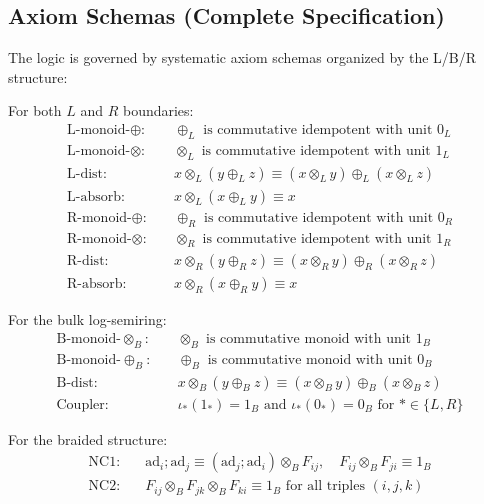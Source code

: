 \subsection{Axiom Schemas (Complete Specification)}

The logic is governed by systematic axiom schemas organized by the L/B/R structure:

\begin{definition}
\label{def:boundary-axioms}
For both $L$ and $R$ boundaries:
\begin{align}
\text{L-monoid-}\oplus: &\quad \oplus_L \text{ is commutative idempotent with unit } 0_L \\
\text{L-monoid-}\otimes: &\quad \otimes_L \text{ is commutative idempotent with unit } 1_L \\
\text{L-dist:} &\quad x \otimes_L (y \oplus_L z) \equiv (x \otimes_L y) \oplus_L (x \otimes_L z) \\
\text{L-absorb:} &\quad x \otimes_L (x \oplus_L y) \equiv x \\
\text{R-monoid-}\oplus: &\quad \oplus_R \text{ is commutative idempotent with unit } 0_R \\
\text{R-monoid-}\otimes: &\quad \otimes_R \text{ is commutative idempotent with unit } 1_R \\
\text{R-dist:} &\quad x \otimes_R (y \oplus_R z) \equiv (x \otimes_R y) \oplus_R (x \otimes_R z) \\
\text{R-absorb:} &\quad x \otimes_R (x \oplus_R y) \equiv x
\end{align}
\end{definition}

\begin{definition}
\label{def:bulk-axioms}
For the bulk log-semiring:
\begin{align}
\text{B-monoid-}\otimes_B: &\quad \otimes_B \text{ is commutative monoid with unit } 1_B \\
\text{B-monoid-}\oplus_B: &\quad \oplus_B \text{ is commutative monoid with unit } 0_B \\
\text{B-dist:} &\quad x \otimes_B (y \oplus_B z) \equiv (x \otimes_B y) \oplus_B (x \otimes_B z) \\
\text{Coupler:} &\quad \iota_*(1_*) = 1_B \text{ and } \iota_*(0_*) = 0_B \text{ for } * \in \{L,R\}
\end{align}
\end{definition}

\begin{definition}
\label{def:braided-axioms}
For the braided structure:
\begin{align}
\text{NC1:} &\quad \text{ad}_i ; \text{ad}_j \equiv (\text{ad}_j ; \text{ad}_i) \otimes_B F_{ij}, \quad F_{ij} \otimes_B F_{ji} \equiv 1_B \\
\text{NC2:} &\quad F_{ij} \otimes_B F_{jk} \otimes_B F_{ki} \equiv 1_B \text{ for all triples } (i,j,k)
\end{align}
\end{definition}

